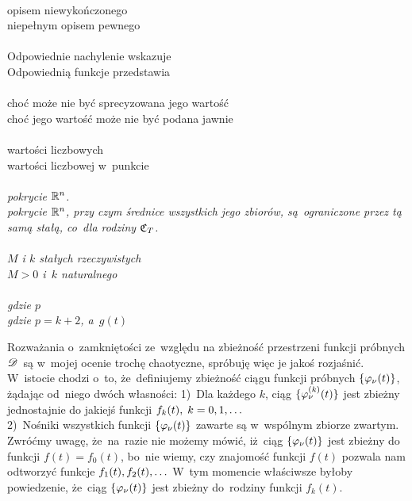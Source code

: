 \documentclass[a4paper,11pt]{article}
\begin{document}
\noi {} \\
\Jest opisem niewykończonego \\
\Pow niepełnym opisem pewnego \\
 \\
\Jest Odpowiednie nachylenie wskazuje \\
\Pow Odpowiednią funkcje przedstawia \\
 \\
\Jest choć może nie być sprecyzowana jego wartość \\
\Pow choć jego wartość może nie być podana jawnie \\
 \\
\Jest wartości liczbowych \\
\Pow wartości liczbowej w~punkcie \\
 \\
\Jest \emph{pokrycie $\mathbb{ R }^{ n }$.} \\
\Pow \emph{pokrycie $\mathbb{ R }^{ n }$, przy czym średnice wszystkich jego zbiorów,
  są~ograniczone przez tą samą stałą, co~dla rodziny $\mathfrak{C}_{ T }$.} \\
 \\
\Jest \emph{$M$ i $k$ stałych rzeczywistych} \\
\Pow \emph{$M > 0$ i~$k$ naturalnego} \\
 \\
\Jest \emph{gdzie $p$} \\
\Pow \emph{gdzie $p = k + 2$, a~$g( t )$} \\

\vspace{\spaceTwo}









\noi {}

\vspace{\spaceThree}

\start {} Rozważania o~zamkniętości ze~względu na zbieżność
przestrzeni funkcji próbnych $\mathcal{D}$~są w~mojej ocenie trochę
chaotyczne, spróbuję więc je jakoś rozjaśnić. W~istocie chodzi o~to,
że~definiujemy zbieżność ciągu funkcji próbnych
$\{  \varphi_{ \nu }( t )  \}$, żądając od~niego dwóch własności: 1)~Dla
każdego $k$, ciąg $\{  \varphi_{ \nu }^{ ( k ) }( t )  \}$ jest zbieżny
jednostajnie do jakiejś funkcji
$f_{ k }( t ), \; k = 0, 1, \ldots$ \\
2)~Nośniki wszystkich funkcji $\{  \varphi_{ \nu }( t )  \}$ zawarte są
w~wspólnym zbiorze zwartym. \\
Zwróćmy uwagę, że~na~razie nie możemy mówić, iż~ciąg
$\{  \varphi_{ \nu }( t )  \}$ jest zbieżny do funkcji
$f( t ) = f_{ 0 }( t )$, bo~nie wiemy, czy znajomość funkcji $f( t )$
pozwala nam odtworzyć funkcje $f_{ 1 }( t ), f_{ 2 }( t ), \ldots$ W~tym
momencie właściwsze byłoby powiedzenie, że~ciąg
$\{  \varphi_{ \nu }( t )  \}$ jest zbieżny do~rodziny funkcji
$f_{ k }( t )$.
\end{document}
